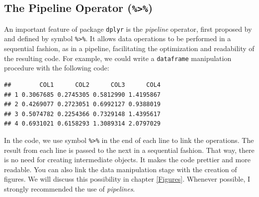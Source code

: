 \documentclass[11pt,]{book}
\newenvironment{Shaded}{\begin{snugshade}}{\end{snugshade}}
\newcommand{\KeywordTok}[1]{\textcolor[rgb]{0.27,0.27,0.27}{\textbf{#1}}}
\newcommand{\DataTypeTok}[1]{\textcolor[rgb]{0.27,0.27,0.27}{#1}}
\newcommand{\FloatTok}[1]{\textcolor[rgb]{0.06,0.06,0.06}{#1}}
\newcommand{\StringTok}[1]{\textcolor[rgb]{0.5,0.5,0.5}{#1}}
\newcommand{\CommentTok}[1]{\textcolor[rgb]{0.56,0.35,0.01}{\textit{#1}}}
\newcommand{\OperatorTok}[1]{\textcolor[rgb]{0.81,0.36,0.00}{\textbf{#1}}}
\newcommand{\NormalTok}[1]{#1}
\begin{document}
\subsection{\texorpdfstring{The Pipeline Operator
(\texttt{\%\textgreater{}\%})}{The Pipeline Operator (\%\textgreater{}\%)}}\label{the-pipeline-operator}

An important feature of package \texttt{dplyr} is the \emph{pipeline}
operator, first proposed by \citet{magrittr} and defined by symbol
\texttt{\%\textgreater{}\%}. It allows data operations to be performed
in a sequential fashion, as in a pipeline, facilitating the optimization
and readability of the resulting code. For example, we could write a
\texttt{dataframe} manipulation procedure with the following code:

\begin{Shaded}
\end{Shaded}

\begin{verbatim}
##        COL1      COL2      COL3      COL4
## 1 0.3067685 0.2745305 0.5812990 1.4195867
## 2 0.4269077 0.2723051 0.6992127 0.9388019
## 3 0.5074782 0.2254366 0.7329148 1.4395617
## 4 0.6931021 0.6158293 1.3089314 2.0797029
\end{verbatim}

In the code, we use symbol \texttt{\%\textgreater{}\%} in the end of
each line to link the operations. The result from each line is passed to
the next in a sequential fashion. That way, there is no need for
creating intermediate objects. It makes the code prettier and more
readable. You can also link the data manipulation stage with the
creation of figures. We will discuss this possibility in chapter
\ref{Figures}. Whenever possible, I strongly recommended the use of
\emph{pipelines}.
\end{document}
